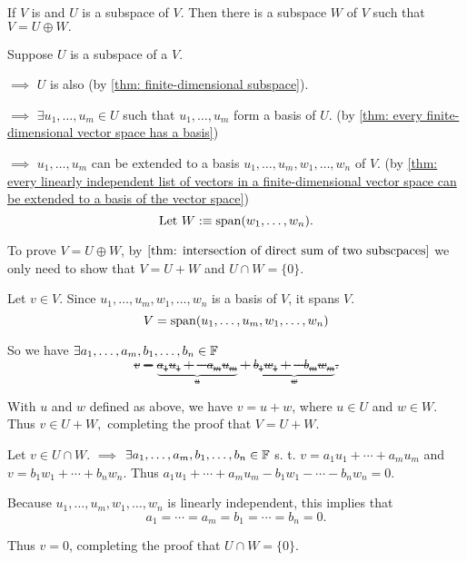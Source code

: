 \begin{thm} 
  \label{thm: every subspace of V is part of a direct sum equal to V}
  If $V$ is \fd and $U$ is a subspace of $V$. Then there is a subspace $W$ of $V$ such that $V=U \oplus W.$
\end{thm}
\begin{prf}
  Suppose $U$ is a subspace of a \fdvs $V$.

  $\implies$ $U$ is also \fd (by \ref{thm: finite-dimensional subspace}).

  $\implies$ $\exists u_1, \ldots, u_m \in U $ such that $u_1, \ldots, u_m $ form a basis of $U$. (by \ref{thm: every finite-dimensional vector space has a basis})

  $\implies$ $u_1, \ldots, u_m$ can be extended to a basis $u_1, \ldots, u_m, w_1, \ldots, w_n$ of $V$. (by \ref{thm: every linearly independent list of vectors in a finite-dimensional vector space can be extended to a basis of the vector space})
  \begin{equation}
    $Let $W :\equiv \myspan{w_1, \ldots, w_n}.
  \end{equation}

  To prove $V=U\oplus W$, by $\ref{thm: intersection of direct sum of two subscpaces}$ we only need to show that $V = U+W$ and $U \cap W = \{0\}$.


  \begin{description}
    \item{} Let $v \in V$. Since $u_1, \ldots, u_m, w_1, \ldots, w_n$ is a basis of $V$, it spans $V$.
    \begin{equation}
      V = \operatorname{span} (u_1, \ldots, u_m, w_1, \ldots, w_n)
    \end{equation}

    So we have $\exists a_1, \ldots, a_m, b_1, \ldots, b_n \in \mathbb{F}$ \st
    \begin{equation}
      v = \underbrace{a_1 u_1 + \cdots a_m u_m}_{u} + \underbrace{b_1 w_1 + \cdots b_m w_m}_{w}.
    \end{equation}

    With $u$ and $w$ defined as above, we have $v=u+w$, where $u \in U$ and $w \in W$. Thus $v \in U+W,$ completing the proof that $V=U+W$.

    \item{} Let $v \in U \cap W$. $\implies$ $\exists a_1, \ldots, a_m, b_1, \ldots, b_n \in \mathbb{F}$ s. t. $v= a_1 u _1 + \cdots + a_m u_m$ and $v= b_1 w_1 + \cdots + b_n w_n$. Thus $a_1 u_1 + \cdots + a_m u_m - b_1 w_1 - \cdots - b_n w_n = 0$.

    Because $u_1, \ldots, u_m, w_1, \ldots, w_n$ is linearly independent, this implies that
    \begin{equation}
      a_1 = \cdots = a_m = b_1 = \cdots= b_n = 0.
    \end{equation}

    Thus $v=0$, completing the proof that $U\cap W = \{0\}.$

  \end{description}
  \vspace{-1em}
\end{prf}

